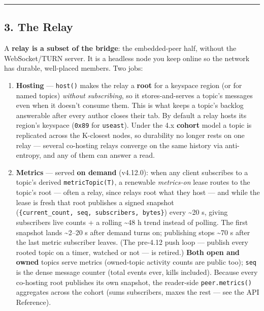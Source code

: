 \documentclass[
  nobib]{tufte-handout}
\providecommand{\tightlist}{%
  \setlength{\itemsep}{0pt}\setlength{\parskip}{0pt}}
\renewcommand{\subsubsection}[1]{\medskip\par\noindent{\normalsize\bfseries #1}\par\nobreak\smallskip}
\begin{document}
\begin{center}\rule{0.5\linewidth}{0.5pt}\end{center}

\subsection{3. The Relay}\label{the-relay}

\subsubsection{What it is}\label{what-it-is-1}

A \textbf{relay is a subset of the bridge}: the embedded-peer half,
without the WebSocket/TURN server. It is a headless node you keep online
so the network has durable, well-placed members. Two jobs:

\begin{enumerate}
\def\labelenumi{\arabic{enumi}.}
\tightlist
\item
  \textbf{Hosting} --- \texttt{host()} makes the relay a \textbf{root}
  for a keyspace region (or for named topics) \emph{without
  subscribing}, so it stores-and-serves a topic's messages even when it
  doesn't consume them. This is what keeps a topic's backlog answerable
  after every author closes their tab. By default a relay hosts its
  region's keyspace (\texttt{0x89} for \texttt{useast}). Under the 4.x
  \textbf{cohort} model a topic is replicated across the K-closest
  nodes, so durability no longer rests on one relay --- several
  co-hosting relays converge on the same history via anti-entropy, and
  any of them can answer a read.
\item
  \textbf{Metrics} --- served \textbf{on demand} (v4.12.0): when any
  client subscribes to a topic's derived \texttt{metricTopic(T)}, a
  renewable \emph{metrics-on} lease routes to the topic's root --- often
  a relay, since relays root what they host --- and while the lease is
  fresh that root publishes a signed snapshot
  (\texttt{\{current\_count,\ seq,\ subscribers,\ bytes\}}) every
  \textasciitilde20 s, giving subscribers live counts + a rolling
  \textasciitilde48 h trend instead of polling. The first snapshot lands
  \textasciitilde2--20 s after demand turns on; publishing stops
  \textasciitilde70 s after the last metric subscriber leaves. (The
  pre-4.12 push loop --- publish every rooted topic on a timer, watched
  or not --- is retired.) \textbf{Both open and owned} topics serve
  metrics (owned-topic activity counts are public too); \texttt{seq} is
  the dense message counter (total events ever, kills included). Because
  every co-hosting root publishes its own snapshot, the reader-side
  \texttt{peer.metrics()} aggregates across the cohort (sums
  subscribers, maxes the rest --- see the API Reference).
\end{enumerate}
\end{document}
